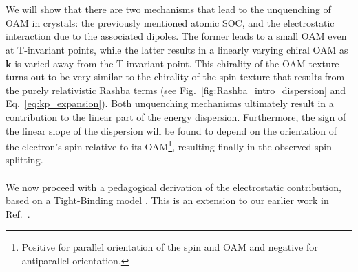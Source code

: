 \\\\
We will show that there are two mechanisms that lead to the unquenching of OAM in crystals: the previously mentioned atomic SOC, and the electrostatic interaction due to the associated dipoles.
The former leads to a small OAM even at T-invariant points, while the latter results in a linearly varying chiral OAM as $\bm k$ is varied away from the T-invariant point.
This chirality of the OAM texture turns out to be very similar to the chirality of the spin texture that results from the purely relativistic Rashba terms (see Fig.~\ref{fig:Rashba_intro_dispersion} and Eq.~\eqref{eq:kp_expansion}).
Both unquenching mechanisms ultimately result in a contribution to the linear part of the energy dispersion.
Furthermore, the sign of the linear slope of the dispersion will be found to depend on the orientation of the electron's spin relative to its OAM\footnote{Positive for parallel orientation of the spin and OAM and negative for antiparallel orientation.}, resulting finally in the observed spin-splitting.
\\\\
We now proceed with a pedagogical derivation of the electrostatic contribution, based on a Tight-Binding model \cite{Bloch1929,Slater1954,Petersen2000,Kim2014,Go2016}. This is an extension to our earlier work in Ref.~\cite{Ponet2018}.

